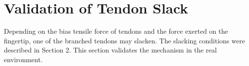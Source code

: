 \documentclass{llncs}
\begin{document}


\section{Validation of Tendon Slack} %
\label{sec:verification}
Depending on the bias tensile force of tendons and the force exerted on the fingertip,
one of the branched tendons may slacken.
The slacking conditions were described in Section 2.
This section validates the mechanism in the real environment.

\end{document}
